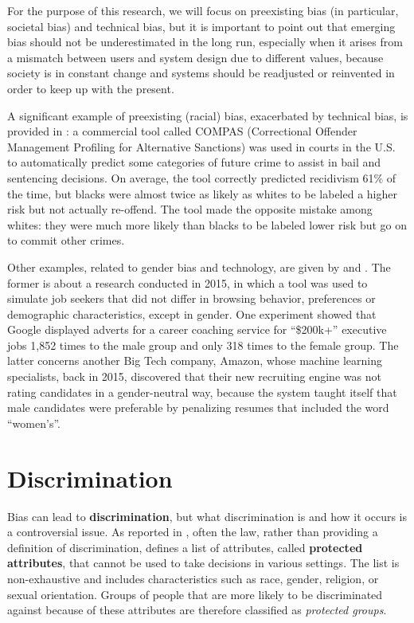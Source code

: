 For the purpose of this research, we will focus on preexisting bias (in particular, societal bias) and technical bias, but it is important to point out that emerging bias should not be underestimated in the long run, especially when it arises from a mismatch between users and system design due to different values, because society is in constant change and systems should be readjusted or reinvented in order to keep up with the present.

A significant example of preexisting (racial) bias, exacerbated by technical bias, is provided in \cite{angwin2016machine}: a commercial tool called COMPAS (Correctional Offender Management Profiling for Alternative Sanctions) was used in courts in the U.S. to automatically predict some categories of future crime to assist in bail and sentencing decisions. On average, the tool correctly predicted recidivism 61\% of the time, but blacks were almost twice as likely as whites to be labeled a higher risk but not actually re-offend. The tool made the opposite mistake among whites: they were much more likely than blacks to be labeled lower risk but go on to commit other crimes.

Other examples, related to gender bias and technology, are given by \cite{gibbs2015women} and \cite{dastin2018amazon}. The former is about a research conducted in 2015, in which a tool was used to simulate job seekers that did not differ in browsing behavior, preferences or demographic characteristics, except in gender. One experiment showed that Google displayed adverts for a career coaching service for ``\$200k+'' executive jobs 1,852 times to the male group and only 318 times to the female group. The latter concerns another Big Tech company, Amazon, whose machine learning specialists, back in 2015, discovered that their new recruiting engine was not rating candidates in a gender-neutral way, because the system taught itself that male candidates were preferable by penalizing resumes that included the word ``women's''.


\section{Discrimination}
Bias can lead to \textbf{discrimination}, but what discrimination is and how it occurs is a controversial issue. As reported in \cite{scantamburlo2018machine}, often the law, rather than providing a definition of discrimination, defines a list of attributes, called \textbf{protected attributes}, that cannot be used to take decisions in various settings. The list is non-exhaustive and includes characteristics such as race, gender, religion, or sexual orientation. Groups of people that are more likely to be discriminated against because of these attributes are therefore classified as \textit{protected groups}.

